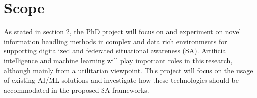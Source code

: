 \chapter{Scope}

As stated in section 2, the PhD project will focus on and experiment on novel information handling methods in complex and data rich environments for supporting digitalized and federated situational awareness (SA). Artificial intelligence and machine learning will play important roles in this research, although mainly from a utilitarian viewpoint. This project will focus on the usage of existing AI/ML solutions and investigate how these technologies should be accommodated in the proposed SA frameworks.